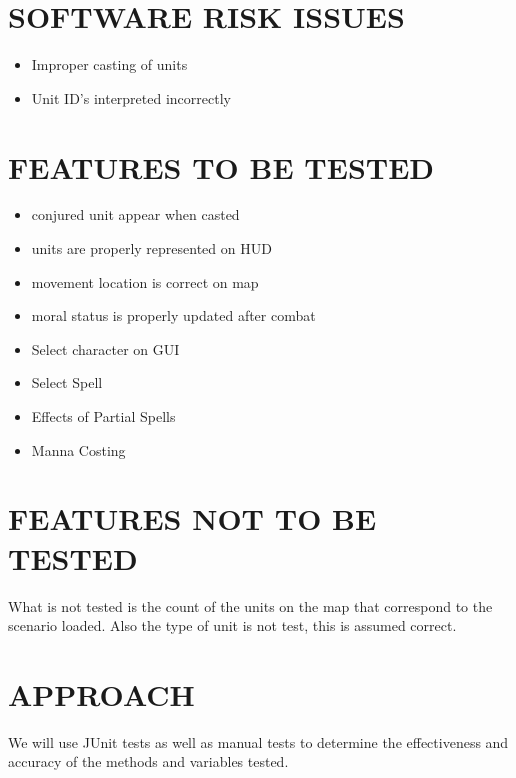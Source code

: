 \section[SOFTWARE RISK ISSUES]{\bfseries\color{black} SOFTWARE RISK ISSUES}
{\color{black}

{\color{black}
\begin{itemize}
\item Improper casting of units
\item Unit ID's interpreted incorrectly
\end{itemize}
}

\section[FEATURES TO BE TESTED]{\bfseries\color{black} FEATURES TO BE TESTED}

{\color{black}
\begin{itemize}
\item conjured unit appear when casted
\item units are properly represented on HUD
\item movement location is correct on map
\item moral status is properly updated after combat
\item Select character on GUI
\item Select Spell
\item Effects of Partial Spells
\item Manna Costing
\end{itemize}
}

\section[FEATURES NOT TO BE TESTED]{\bfseries\color{black} FEATURES NOT TO BE TESTED}

{\color{black}
What is not tested is the count of the units on the map that correspond to the scenario loaded. Also the type of unit is not test, this is assumed correct. 
}

\section[APPROACH]{\bfseries\color{black} APPROACH}
{\color{black}

{\color{black}
We will use JUnit tests as well as manual tests to determine the effectiveness and accuracy of the methods and variables tested. 
}

}}
